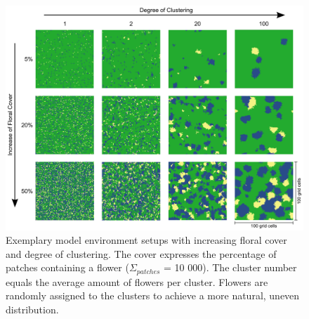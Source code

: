 \begin{figure} [!ht] %
	\centering
	\includegraphics[width=15cm]{Images/cluster}
	\caption{ Exemplary model environment setups with increasing floral cover and degree of clustering. The cover expresses the percentage of patches containing a flower ($\Sigma_{patches}$ = 10 000). The cluster number equals the average amount of flowers per cluster. Flowers are randomly assigned to the clusters to achieve a more natural, uneven distribution. }
	\label{fig:cluster}
\end{figure}

